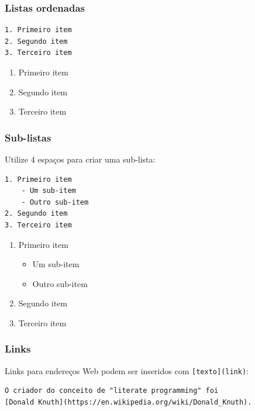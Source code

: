 \documentclass[10pt,a4paper]{book}
\providecommand{\tightlist}{%
  \setlength{\itemsep}{0pt}\setlength{\parskip}{0pt}}
\begin{document}
\subsubsection*{Listas ordenadas}\label{listas-ordenadas}


\begin{verbatim}
1. Primeiro item
2. Segundo item
3. Terceiro item
\end{verbatim}

\begin{enumerate}
\def\labelenumi{\arabic{enumi}.}
\tightlist
\item
  Primeiro item
\item
  Segundo item
\item
  Terceiro item
\end{enumerate}

\subsubsection*{Sub-listas}\label{sub-listas}


Utilize 4 espaços para criar uma sub-lista:

\begin{verbatim}
1. Primeiro item
    - Um sub-item
    - Outro sub-item
2. Segundo item
3. Terceiro item
\end{verbatim}

\begin{enumerate}
\def\labelenumi{\arabic{enumi}.}
\tightlist
\item
  Primeiro item

  \begin{itemize}
  \tightlist
  \item
    Um sub-item
  \item
    Outro sub-item
  \end{itemize}
\item
  Segundo item
\item
  Terceiro item
\end{enumerate}

\subsubsection*{Links}\label{links}


Links para endereços Web podem ser inseridos com
\texttt{{[}texto{]}(link)}:

\begin{verbatim}
O criador do conceito de "literate programming" foi
[Donald Knuth](https://en.wikipedia.org/wiki/Donald_Knuth).
\end{verbatim}
\end{document}
